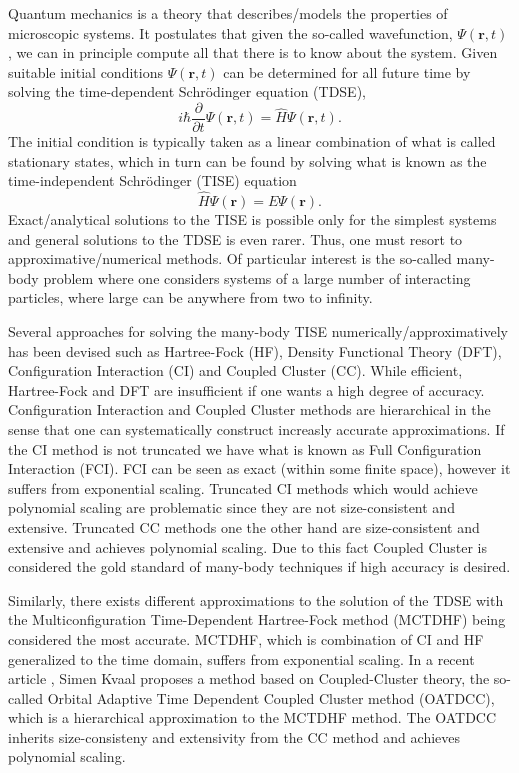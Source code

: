 \documentclass[aip,jcp,reprint,floatfix]{revtex4-1}
\begin{document}
Quantum mechanics is a theory that describes/models the properties of
microscopic systems. It postulates that given the so-called
wavefunction, $\Psi(\mathbf{r},t)$, we can in principle compute all
that there is to know about the system.  Given suitable initial
conditions $\Psi(\mathbf{r},t)$ can be determined for all future time
by solving the time-dependent Schrödinger equation (TDSE),
\begin{equation}
 i \hbar \frac{\partial }{\partial t} \Psi(\mathbf{r},t) = \hat{H} \Psi(\mathbf{r},t).
\end{equation}
The initial condition is typically taken as a linear combination of what is called stationary states, which in turn can be found by solving what is known as the 
time-independent Schrödinger (TISE) equation
\begin{equation}
 \hat{H} \Psi(\mathbf{r}) = E \Psi(\mathbf{r}).
\end{equation}
Exact/analytical solutions to the TISE is possible only for the
simplest systems and general solutions to the TDSE is even
rarer. Thus, one must resort to approximative/numerical methods. Of
particular interest is the so-called many-body problem where one
considers systems of a large number of interacting particles, where
large can be anywhere from two to infinity.

Several approaches for solving the many-body TISE
numerically/approximatively has been devised such as Hartree-Fock
(HF), Density Functional Theory (DFT), Configuration Interaction (CI)
and Coupled Cluster (CC). While efficient, Hartree-Fock and DFT are
insufficient if one wants a high degree of accuracy. Configuration
Interaction and Coupled Cluster methods are hierarchical in the sense
that one can systematically construct increasly accurate
approximations. If the CI method is not truncated we have what is
known as Full Configuration Interaction (FCI). FCI can be seen as
exact (within some finite space), however it suffers from exponential
scaling. Truncated CI methods which would achieve polynomial scaling
are problematic since they are not size-consistent and
extensive. Truncated CC methods one the other hand are size-consistent
and extensive and achieves polynomial scaling. Due to this fact
Coupled Cluster is considered the gold standard of many-body
techniques if high accuracy is desired.

Similarly, there exists different approximations to the solution of
the TDSE with the Multiconfiguration Time-Dependent Hartree-Fock
method (MCTDHF) being considered the most accurate. MCTDHF, which is
combination of CI and HF generalized to the time domain, suffers from
exponential scaling. In a recent article \cite{Kvaal12}, Simen Kvaal
proposes a method based on Coupled-Cluster theory, the so-called
Orbital Adaptive Time Dependent Coupled Cluster method (OATDCC), which
is a hierarchical approximation to the MCTDHF method. The OATDCC
inherits size-consisteny and extensivity from the CC method and
achieves polynomial scaling.
\end{document}
